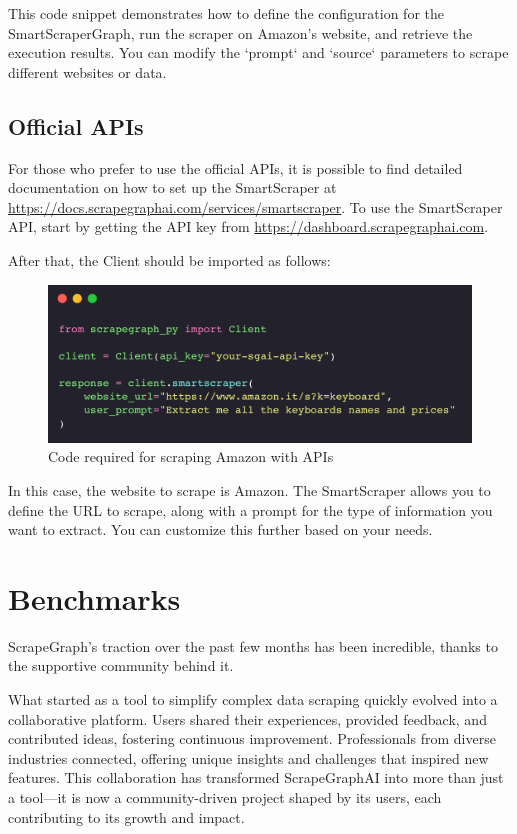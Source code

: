 This code snippet demonstrates how to define the configuration for the SmartScraperGraph, run the scraper on Amazon's website, and retrieve the execution results. You can modify the `prompt` and `source` parameters to scrape different websites or data.

\subsection{Official APIs}

For those who prefer to use the official APIs, it is possible to find detailed documentation on how to set up the SmartScraper at \url{https://docs.scrapegraphai.com/services/smartscraper}. 
To use the SmartScraper API, start by getting the API key from \url{https://dashboard.scrapegraphai.com}.

After that, the Client should be imported as follows:

\begin{figure}[h!]
    \centering
    \includegraphics[width=0.95\linewidth]{Assets/api.png}
    \caption{Code required for scraping Amazon with APIs}
    \label{fig:enter-label}
\end{figure}

In this case, the website to scrape is Amazon. The SmartScraper allows you to define the URL to scrape, along with a prompt for the type of information you want to extract. You can customize this further based on your needs.

\section{Benchmarks}

ScrapeGraph's traction over the past few months has been incredible, thanks to the supportive community behind it.

What started as a tool to simplify complex data scraping quickly evolved into a collaborative platform. Users shared their experiences, provided feedback, and contributed ideas, fostering continuous improvement. Professionals from diverse industries connected, offering unique insights and challenges that inspired new features. This collaboration has transformed ScrapeGraphAI into more than just a tool—it is now a community-driven project shaped by its users, each contributing to its growth and impact.

